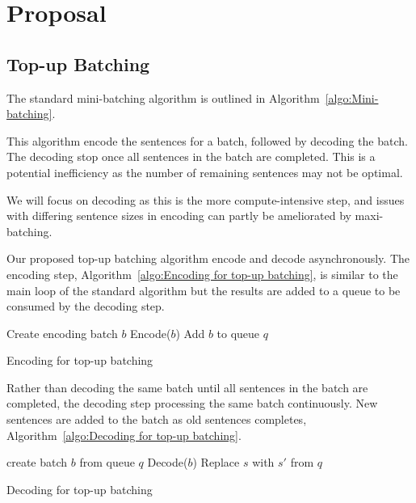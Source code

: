 \documentclass[11pt,a4paper]{article}
\begin{document}
\section{Proposal}
\label{sec:Proposal}



\subsection{Top-up Batching}

The standard mini-batching algorithm is outlined in Algorithm~\ref{algo:Mini-batching}.


This algorithm encode the sentences for a batch, followed by decoding the batch. The decoding stop once all sentences in the batch are completed. This is a potential inefficiency as the number of remaining sentences may not be optimal.

We will focus on decoding as this is the more compute-intensive step, and issues with differing sentence sizes in encoding can partly be ameliorated by maxi-batching.

Our proposed top-up batching algorithm encode and decode asynchronously. The encoding step, Algorithm~\ref{algo:Encoding for top-up batching}, is similar to the main loop of the standard algorithm but the results are added to a queue to be consumed by the decoding step.

\begin{algorithm}
\begin{algorithmic}

  \State Create encoding batch $b$
  \State Encode($b$)
  \State Add $b$ to queue $q$
\EndWhile 

\EndProcedure

\end{algorithmic}
\caption{Encoding for top-up batching}
\label{algo:Encoding for top-up batching}
\end{algorithm}

Rather than decoding the same batch until all sentences in the batch are completed, the decoding step processing the same batch continuously. New sentences are added to the batch as old sentences completes, Algorithm~\ref{algo:Decoding for top-up batching}.

\begin{algorithm}
\begin{algorithmic}


\State create batch $b$ from queue $q$
  \State Decode($b$)
      \State Replace $s$ with $s'$ from $q$
    \EndIf
  \EndFor
\EndWhile

\EndProcedure

\end{algorithmic}
\caption{Decoding for top-up batching}
\label{algo:Decoding for top-up batching}
\end{algorithm}
\end{document}
